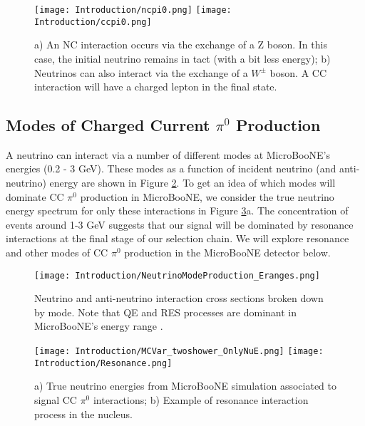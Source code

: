 \begin{figure}[H]
\centering
\texttt{[image: Introduction/ncpi0.png]}
\hspace{3 mm}
\texttt{[image: Introduction/ccpi0.png]}
\caption{a) An NC interaction occurs via the exchange of a Z boson. In this case, the initial neutrino remains in tact (with a bit less energy); b) Neutrinos can also interact via the exchange of a $W^\pm$ boson. A CC interaction will have a charged lepton in the final state. } 
\label{fig:CCNC}
\end{figure}




\subsection{ Modes of Charged Current $\pi^0$ Production}
A neutrino can interact via a number of different modes at MicroBooNE's energies (0.2 - 3 GeV). These modes as a function of incident neutrino (and anti-neutrino) energy are shown in Figure \ref{fig:numodes}. To get an idea of which modes will dominate CC $\pi^0$ production in MicroBooNE, we consider the true neutrino energy spectrum for only these interactions in Figure \ref{fig:res}a. The concentration of events around 1-3 GeV suggests that our signal will be dominated by resonance interactions at the final stage of our selection chain. We will explore resonance and other modes of CC $\pi^0$ production in the MicroBooNE detector below.

\begin{figure}[h!]
\centering
\texttt{[image: Introduction/NeutrinoModeProduction\_Eranges.png]}
\caption{Neutrino and anti-neutrino interaction cross sections broken down by mode. Note that QE and RES processes are dominant in MicroBooNE's energy range \cite{bib:gzeller}. }
\label{fig:numodes}
\end{figure}

\begin{figure}[h!]
\centering
\texttt{[image: Introduction/MCVar\_twoshower\_OnlyNuE.png]}
\hspace{2mm}
\texttt{[image: Introduction/Resonance.png]}
\caption{ a) True neutrino energies from MicroBooNE simulation associated to signal CC $\pi^0$ interactions; b) Example of resonance interaction process in the nucleus. }
\label{fig:res}
\end{figure}

